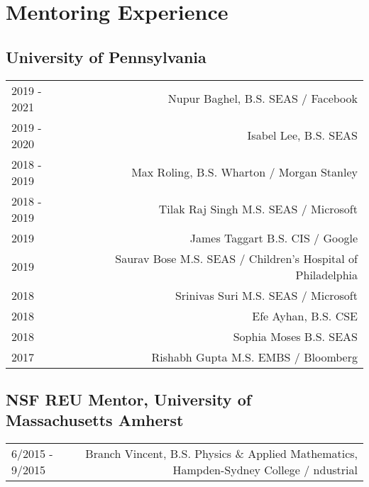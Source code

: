 \section*{Mentoring Experience}
\subsection*{University of Pennsylvania}
\begin{tabular}{L!{\VRule}R}
2019 - 2021 &   Nupur Baghel, B.S. SEAS / Facebook \\
2019 - 2020 &   Isabel Lee, B.S. SEAS \\
2018 - 2019 &   Max Roling, B.S. Wharton / Morgan Stanley \\  
2018 - 2019 &   Tilak Raj Singh  M.S. SEAS / Microsoft \\
2019        &   James Taggart  B.S. CIS / Google \\
2019        &   Saurav Bose  M.S. SEAS / Children's Hospital of Philadelphia \\
2018        &   Srinivas Suri  M.S. SEAS / Microsoft \\ 
2018        &   Efe Ayhan, B.S. CSE \\
2018        &   Sophia Moses  B.S. SEAS \\
2017        &   Rishabh Gupta  M.S. EMBS / Bloomberg \\
\end{tabular}
\subsection*{NSF REU Mentor, University of Massachusetts Amherst}
\begin{tabular}{L!{\VRule}R}
    6/2015 - 9/2015 &  Branch Vincent, B.S. Physics \& Applied Mathematics, Hampden-Sydney College / ndustrial\\
\end{tabular}
